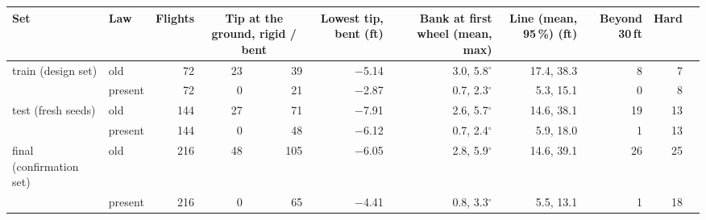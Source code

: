 \begin{tabular}{@{}l l r r r r r r r r r@{}}
\toprule
Set & Law & Flights & \multicolumn{2}{c}{Tip at the ground, rigid / bent} & Lowest tip, bent (ft) & Bank at first wheel (mean, max) & Line (mean, 95\,\%) (ft) & Beyond 30\,ft & Hard \\
\midrule
train (design set) & old & 72 & 23 & 39 & $-$5.14 & 3.0, 5.8$^\circ$ & 17.4, 38.3 & 8 & 7 \\
 & present & 72 & 0 & 21 & $-$2.87 & 0.7, 2.3$^\circ$ & 5.3, 15.1 & 0 & 8 \\
\midrule
test (fresh seeds) & old & 144 & 27 & 71 & $-$7.91 & 2.6, 5.7$^\circ$ & 14.6, 38.1 & 19 & 13 \\
 & present & 144 & 0 & 48 & $-$6.12 & 0.7, 2.4$^\circ$ & 5.9, 18.0 & 1 & 13 \\
\midrule
final (confirmation set) & old & 216 & 48 & 105 & $-$6.05 & 2.8, 5.9$^\circ$ & 14.6, 39.1 & 26 & 25 \\
 & present & 216 & 0 & 65 & $-$4.41 & 0.8, 3.3$^\circ$ & 5.5, 13.1 & 1 & 18 \\
\bottomrule
\end{tabular}

